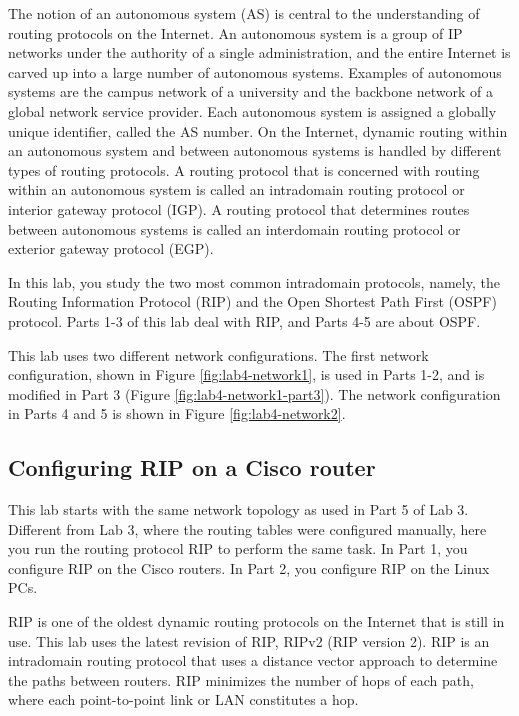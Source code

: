 The notion of an autonomous system (AS) is central to the understanding of routing protocols on the Internet. An autonomous system is a group of IP networks under the authority of a single administration, and the entire Internet is carved up into a large number of autonomous systems. Examples of autonomous systems are the campus network of a university and the backbone network of a global network service provider. Each autonomous system is assigned a globally unique identifier, called the AS number. On the Internet, dynamic routing within an autonomous system and between autonomous systems is handled by different types of routing protocols. A routing protocol that is concerned with routing within an autonomous system is called an intradomain routing protocol or interior gateway protocol (IGP). A routing protocol that determines routes between autonomous systems is called an interdomain routing protocol or exterior gateway protocol (EGP).

In this lab, you study the two most common intradomain protocols, namely, the Routing Information Protocol (RIP) and the Open Shortest Path First (OSPF) protocol. Parts 1-3 of this lab deal with RIP, and Parts 4-5 are about OSPF. 

This lab uses two different network configurations. The first network configuration, shown in Figure \ref{fig:lab4-network1}, is used in Parts 1-2, and is modified in Part 3 (Figure \ref{fig:lab4-network1-part3}). The network configuration in Parts 4 and 5 is shown in Figure \ref{fig:lab4-network2}.

\newpage
\subsection{Configuring RIP on a Cisco router}

This lab starts with the same network topology as used in Part 5 of Lab 3. Different from Lab 3, where the routing tables were configured manually, here you run the routing protocol RIP to perform the same task. In Part 1, you configure RIP on the Cisco routers. In Part 2, you configure RIP on the Linux PCs.

RIP is one of the oldest dynamic routing protocols on the Internet that is still in use. This lab uses the latest revision of RIP, RIPv2 (RIP version 2). RIP is an intradomain routing protocol that uses a distance vector approach to determine the paths between routers. RIP minimizes the number of hops of each path, where each point-to-point link or LAN constitutes a hop.

